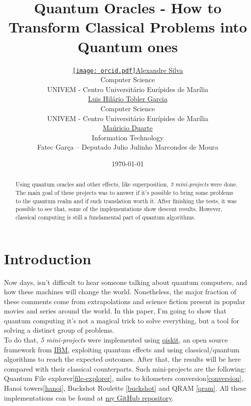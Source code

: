 \documentclass{article}
\title{Quantum Oracles - How to Transform Classical Problems into Quantum ones}
\date{\today}
\author{ 
	\href{https://orcid.org/0009-0008-9134-5974}{\texttt{[image: orcid.pdf]}\hspace{1mm}Alexandre Silva}\\
	Computer Science\\
	UNIVEM - Centro Universitário Eurípides de Marília\\
	\And
	\href{http://lattes.cnpq.br/5170103189904688}{\hspace{1mm}Luis Hilário Tobler Garcia} \\
	Computer Science\\
	UNIVEM - Centro Universitário Eurípides de Marília\\
	\And
	\href{http://lattes.cnpq.br/7265559606596355}{\hspace{1mm}Maúricio Duarte} \\
	Information Technology \\
	Fatec Garça – Deputado Julio Julinho Marcondes de Moura\\
}
\begin{document}
\maketitle
\begin{abstract}
	Using quantum oracles and other effects, like superposition, \emph{5 mini-projects} were done. The main goal of these projects was to answer if it's possible to bring some problems to the quantum realm and if such translation worth it. After finishing the tests, it was possible to see that, some of the implementations show descent results. However, classical computing is still a fundamental part of quantum algorithms.
\end{abstract}


\section{Introduction}
Now days, isn't difficult to hear someone talking about quantum computers, and how these machines will change the world. Nonetheless, the major fraction of these comments come from extrapolations and science fiction present in popular movies and series around the world. In this paper, I'm going to show that quantum computing it's not a magical trick to solve everything, but a tool for solving a distinct group of problems.\\
To do that, \emph{5 mini-projects} were implemented using \href{https://www.ibm.com/quantum/qiskit}{qiskit}, an open source framework from \href{https://www.ibm.com/}{IBM}, exploiting quantum effects and using classical/quantum algorithms to reach the expected outcomes. After that, the results will be here compared with their classical counterparts.
Such mini-projects are the following: Quantum File explorer\ref{file-explorer}, miles to kilometers conversion\ref{conversion}, Hanoi towers\ref{hanoi}, Buckshot Roulette \ref{buckshot} and QRAM \ref{qram}. All these implementations can be found at \href{https://github.com/Dpbm/scientific-initiation-1-quantum-oracles}{my GitHub repository}.
\end{document}
